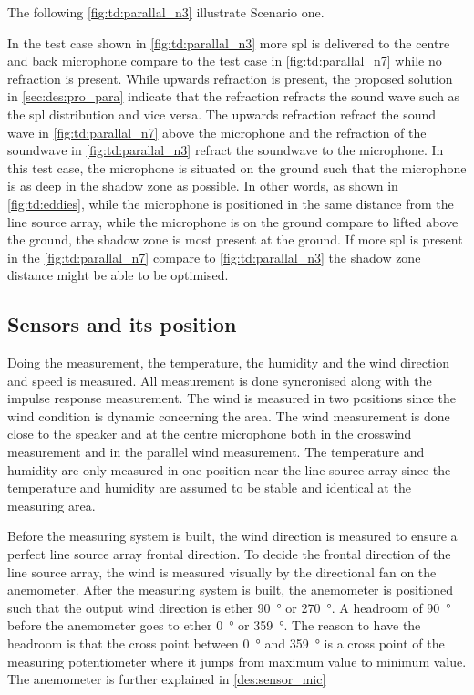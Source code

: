  The following \autoref{fig:td:parallal_n3} illustrate Scenario one.


In the test case shown in \autoref{fig:td:parallal_n3} more \gls{spl} is delivered to the centre and back microphone compare to the test case in  \autoref{fig:td:parallal_n7} while no refraction is present. While upwards refraction is present, the proposed solution in \autoref{sec:des:pro_para} indicate that the refraction refracts the sound wave such as the \gls{spl} distribution and vice versa. The upwards refraction refract the sound wave in \autoref{fig:td:parallal_n7} above the microphone and the refraction of the soundwave in \autoref{fig:td:parallal_n3} refract the soundwave to the microphone.
In this test case, the microphone is situated on the ground such that the microphone is as deep in the shadow zone as possible. In other words, as shown in \autoref{fig:td:eddies}, while the microphone is positioned in the same distance from the line source array, while the microphone is on the ground compare to lifted above the ground, the shadow zone is most present at the ground. If more \gls{spl} is present in the \autoref{fig:td:parallal_n7} compare to \autoref{fig:td:parallal_n3} the shadow zone distance might be able to be optimised.

\subsection{Sensors and its position}
Doing the measurement, the temperature, the humidity and the wind direction and speed is measured. All measurement is done syncronised along with the impulse response measurement. The wind is measured in two positions since the wind condition is dynamic concerning the area. The wind measurement is done close to the speaker and at the centre microphone both in the crosswind measurement and in the parallel wind measurement. The temperature and humidity are only measured in one position near the line source array since the temperature and humidity are assumed to be stable and identical at the measuring area. 

Before the measuring system is built, the wind direction is measured to ensure a perfect line source array frontal direction. To decide the frontal direction of the line source array, the wind is measured visually by the directional fan on the anemometer. After the measuring system is built, the anemometer is positioned such that the output wind direction is ether \SI{90}{\degree} or \SI{270}{\degree}. A headroom of \SI{90}{\degree} before the anemometer goes to ether \SI{0}{\degree} or \SI{359}{\degree}. The reason to have the headroom is that the cross point between \SI{0}{\degree} and \SI{359}{\degree} is a cross point of the measuring potentiometer where it jumps from maximum value to minimum value. The anemometer is further explained in \autoref{des:sensor_mic}

